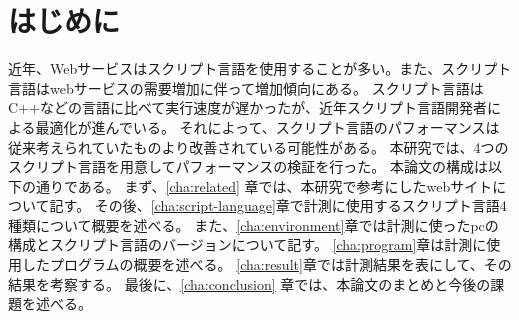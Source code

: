 \chapter{はじめに}
\label{cha:intro}
近年、Webサービスはスクリプト言語を使用することが多い。また、スクリプト言語はwebサービスの需要増加に伴って増加傾向にある。
スクリプト言語はC++などの言語に比べて実行速度が遅かったが、近年スクリプト言語開発者による最適化が進んでいる。
それによって、スクリプト言語のパフォーマンスは従来考えられていたものより改善されている可能性がある。
本研究では、4つのスクリプト言語を用意してパフォーマンスの検証を行った。
本論文の構成は以下の通りである。
まず、\ref{cha:related} 章では、本研究で参考にしたwebサイトについて記す。
その後、\ref{cha:script-language}章で計測に使用するスクリプト言語4種類について概要を述べる。
また、\ref{cha:environment}章では計測に使ったpcの構成とスクリプト言語のバージョンについて記す。
\ref{cha:program}章は計測に使用したプログラムの概要を述べる。
\ref{cha:result}章では計測結果を表にして、その結果を考察する。
最後に、\ref{cha:conclusion} 章では、本論文のまとめと今後の課題を述べる。